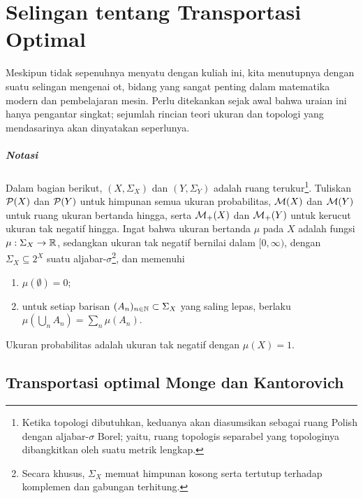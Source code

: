 

\chapter{Selingan tentang Transportasi Optimal}
Meskipun tidak sepenuhnya menyatu dengan kuliah ini, kita menutupnya dengan suatu selingan mengenai \gls{ot}, bidang yang sangat penting dalam matematika modern dan pembelajaran mesin. Perlu ditekankan sejak awal bahwa uraian ini hanya pengantar singkat; sejumlah rincian teori ukuran dan topologi yang mendasarinya akan dinyatakan seperlunya.

\paragraph{Notasi}
Dalam bagian berikut, $(X,\Sigma_X)$ dan $(Y,\Sigma_Y)$ adalah ruang terukur\footnote{Ketika topologi dibutuhkan, keduanya akan diasumsikan sebagai ruang Polish dengan aljabar-$\sigma$ Borel; yaitu, ruang topologis separabel yang topologinya dibangkitkan oleh suatu metrik lengkap.}. Tuliskan $\mathcal{P}(X)$ dan $\mathcal{P}(Y)$ untuk himpunan semua ukuran probabilitas, $\mathcal{M}(X)$ dan $\mathcal{M}(Y)$ untuk ruang ukuran bertanda hingga, serta $\mathcal{M}_+(X)$ dan $\mathcal{M}_+(Y)$ untuk kerucut ukuran tak negatif hingga.
Ingat bahwa ukuran bertanda $\mu$ pada $X$ adalah fungsi $\mu:\Sigma_X\rightarrow\mathbb{R}$, sedangkan ukuran tak negatif bernilai dalam $[0,\infty)$, dengan $\Sigma_X\subseteq2^X$ suatu aljabar-$\sigma$\footnote{Secara khusus, $\Sigma_X$ memuat himpunan kosong serta tertutup terhadap komplemen dan gabungan terhitung.}, dan memenuhi
\begin{enumerate}
    \item $\mu(\emptyset)=0$;
    \item untuk setiap barisan $(A_n)_{n\in\mathbb{N}}\subset\Sigma_X$ yang saling lepas, berlaku $\mu(\bigcup_n A_n)=\sum_n\mu(A_n)$.
\end{enumerate}
Ukuran probabilitas adalah ukuran tak negatif dengan $\mu(X)=1$.

\section{Transportasi optimal Monge dan Kantorovich}

